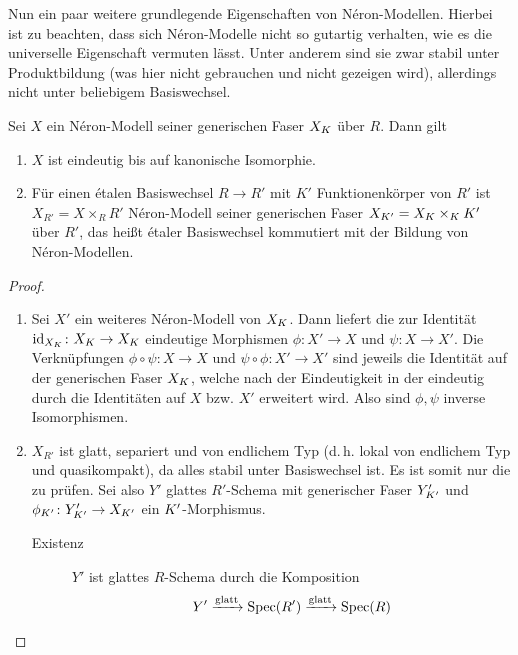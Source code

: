 Nun ein paar weitere grundlegende Eigenschaften von Néron-Modellen.
Hierbei ist zu beachten, dass sich Néron-Modelle nicht so gutartig
verhalten, wie es die universelle Eigenschaft vermuten lässt.
Unter anderem sind sie zwar stabil unter Produktbildung (was hier
nicht gebrauchen und nicht gezeigen wird), allerdings nicht unter
beliebigem Basiswechsel.
\begin{Satz}
  Sei $X$ ein Néron-Modell seiner generischen Faser $X_{K}$ über
  $R$. Dann gilt
  \begin{enumerate}[label=(\roman*)]
  \item $X$ ist eindeutig bis auf kanonische Isomorphie.
  \item Für einen étalen Basiswechsel $R\to R'$ mit $K'$
    Funktionenkörper von $R'$ ist $X_{R'}=X\times_R R'$ Néron-Modell
    seiner generischen Faser $X_{K'}=X_{K}\times_{K}K'$ über $R'$,
    das heißt étaler Basiswechsel kommutiert mit der Bildung von
    Néron-Modellen.
  \end{enumerate}
  \begin{proof}
    \begin{enumerate}[label=(\roman*)]
    \item Sei $X'$ ein weiteres Néron-Modell von $X_{K}$.
      Dann liefert die \NAbbEig zur Identität
      $\mathrm{id}_{X_{K}}\colon X_{K}\to X_{K}$ eindeutige Morphismen
      $\phi\colon X'\to X$ und $\psi\colon X\to X'$.
      Die Verknüpfungen $\phi\circ\psi\colon X\to X$ und
      $\psi\circ\phi\colon X'\to X'$ sind jeweils die Identität auf
      der generischen Faser $X_{K}$, welche nach der Eindeutigkeit in der
      \NAbbEig eindeutig durch die Identitäten auf
      $X$ bzw. $X'$ erweitert wird. Also sind $\phi,\psi$ inverse
      Isomorphismen.
    \item
      $X_{R'}$ ist glatt, separiert und von endlichem Typ 
      (d.\,h. lokal von endlichem Typ und quasikompakt), da alles
      stabil unter Basiswechsel ist. Es ist somit nur die
      \NAbbEig zu prüfen.
      Sei also $Y'$ glattes $R'$-Schema mit generischer Faser
      $Y_{K'}'$ und $\phi_{K'}\colon Y_{K'}'\to X_{K'}$ ein
      $K'$-Morphismus. 
      \begin{description}
      \item[Existenz] 
        $Y'$ ist glattes $R$-Schema durch die Komposition
        \begin{gather*}
          Y'\xrightarrow{\text{glatt}}\Spec(R')
          \xrightarrow{\text{glatt}}\Spec(R)

\end{gather*}
\end{description}
\end{enumerate}
\end{proof}
\end{Satz}
